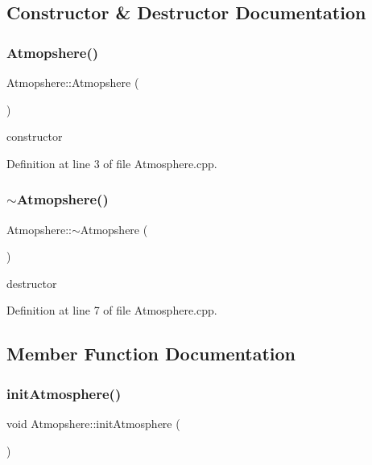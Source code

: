 \subsection{Constructor \& Destructor Documentation}
\mbox{\label{class_atmopshere_a77ca553d3c4e855dd921a451d65cc313}} 
\subsubsection{\texorpdfstring{Atmopshere()}{Atmopshere()}}
{\footnotesize\ttfamily Atmopshere\+::\+Atmopshere (\begin{DoxyParamCaption}{ }\end{DoxyParamCaption})}



constructor 



Definition at line 3 of file Atmosphere.\+cpp.

\mbox{\label{class_atmopshere_ac7815ca8008ed54dc758f2bf7a6104f7}} 
\subsubsection{\texorpdfstring{$\sim$\+Atmopshere()}{~Atmopshere()}}
{\footnotesize\ttfamily Atmopshere\+::$\sim$\+Atmopshere (\begin{DoxyParamCaption}{ }\end{DoxyParamCaption})}



destructor 



Definition at line 7 of file Atmosphere.\+cpp.



\subsection{Member Function Documentation}
\mbox{\label{class_atmopshere_a6e1d5763fbb6631784c99ee3c88911bd}} 
\subsubsection{\texorpdfstring{init\+Atmosphere()}{initAtmosphere()}}
{\footnotesize\ttfamily void Atmopshere\+::init\+Atmosphere (\begin{DoxyParamCaption}{ }\end{DoxyParamCaption})}



